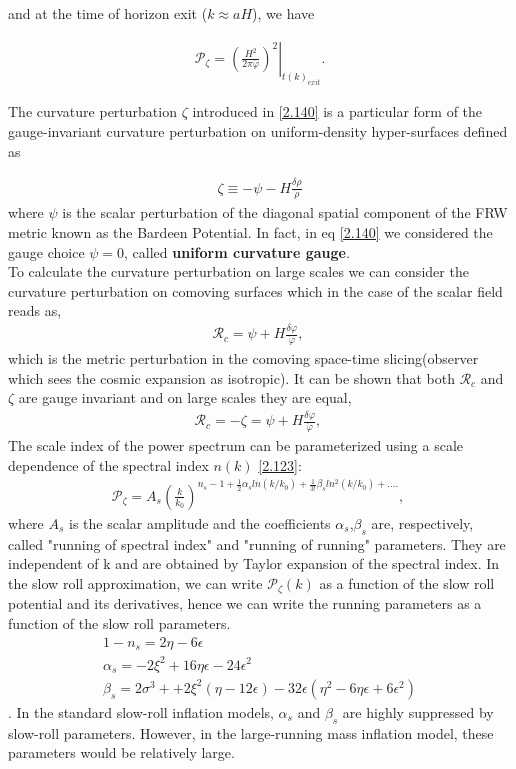 and at the time of horizon exit ($k \approx aH$), we have



\begin{align}
    \mathcal{P}_{\zeta}=\left.\left(\frac{H^2}{2 \pi \dot{\varphi}}\right)^{2}\right|_{t(k)_{exit }} .\label{2.144}
\end{align}

The curvature perturbation $\zeta$ introduced in \ref{2.140} is a particular form of the gauge-invariant curvature perturbation on uniform-density hyper-surfaces defined as

\begin{align}
    \zeta \equiv-\psi-H \frac{\delta \rho}{\dot{\rho}} \label{2.145}
\end{align}
where $\psi$ is the scalar perturbation of the diagonal spatial component of the FRW metric known as the Bardeen Potential. In fact, in eq \ref{2.140} we considered the gauge choice $\psi=0$, called \textbf{uniform curvature gauge}.\\
To calculate the curvature perturbation on large scales we can consider the curvature perturbation on comoving surfaces which in the case of the scalar field reads as,
\begin{align}
    \mathcal{R}_c = \psi + H \frac{\delta \varphi}{\dot{\varphi}},\ \label{2.146}
\end{align}
which is the metric perturbation in the comoving space-time slicing(observer which sees the cosmic expansion as isotropic). It can be shown that both $\mathcal{R}_c$ and $\zeta$
are gauge invariant and on large scales they are equal,
\begin{align}
    \mathcal{R}_c = -\zeta = \psi + H \frac{\delta \varphi}{\dot{\varphi}},\ \label{2.147}
\end{align}
The scale index of the power spectrum can be parameterized using a scale dependence of the spectral index $n(k)$ \ref{2.123}:
\begin{align}
    \mathcal{P}_{\zeta}  = A_s (\frac{k}{k_0})^{n_s -1 + \frac{1}{2}\alpha_{s} ln(k/k_0)+ \frac{1}{3!}\beta_{s}ln^2(k/k_0) + ....},\ \label{2.148}
\end{align}
where $A_{s}$ is the scalar amplitude and the coefficients $\alpha_{s}$,$\beta_{s}$ are, respectively, called "running of spectral index" and "running of running"
parameters. They are independent of k and are obtained by Taylor expansion of the spectral index. In the slow roll approximation, we can write $\mathcal{P}_{\zeta}(k)$ as a function of the slow roll potential and its derivatives, hence we can write the running parameters as a function of the slow roll parameters\cite{baumann2012tasi}.\\
\begin{align}
    1-n_{s} = 2\eta - 6\epsilon \\
    \alpha_s = -2\xi^2 + 16\eta\epsilon - 24\epsilon^2 \\
    \beta_{s} = 2\sigma^3 + + 2\xi^2(\eta -12\epsilon) - 32\epsilon(\eta^2 - 6\eta\epsilon + 6 \epsilon^2) \label{2.149}
\end{align}.
In the standard slow-roll inflation models, $\alpha_s$ and $\beta_{s}$ are highly suppressed by slow-roll parameters. However, in the large-running mass inflation model, these parameters would be
relatively large.